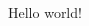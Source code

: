 \documentclass[10pt,landscape,a4paper]{cheatsheet}
\begin{document}
\begin{multicols*}{5}

	Hello world!


\end{multicols*}
\end{document}
